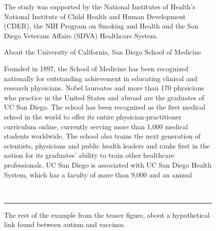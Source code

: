 \documentclass{article}
\begin{document}
\begin{figure}[t]
{The study was supported by the National Institutes of Health’s National Institute of Child Health and Human Development (CDER), the NIH Program on Smoking and Health and the San Diego Veterans Affairs (SDVA) Healthcare System.

About the University of California, San Diego School of Medicine

Founded in 1897, the School of Medicine has been recognized nationally for outstanding achievement in educating clinical and research physicians. Nobel laureates and more than 170 physicians who practice in the United States and abroad are the graduates of UC San Diego. The school has been recognized as the first medical school in the world to offer its entire physician-practitioner curriculum online, currently serving more than 1,000 medical students worldwide. The school also trains the next generation of scientists, physicians and public health leaders and ranks first in the nation for its graduates’ ability to train other healthcare professionals. UC San Diego is associated with UC San Diego Health System, which has a faculty of more than 9,000 and an annual
} \\

\hrule
\caption{The rest of the example from the teaser figure, about a hypothetical link found between autism and vaccines.}
\label{fig:teaserfigurecontinued}
\end{figure}
 
\end{document}
